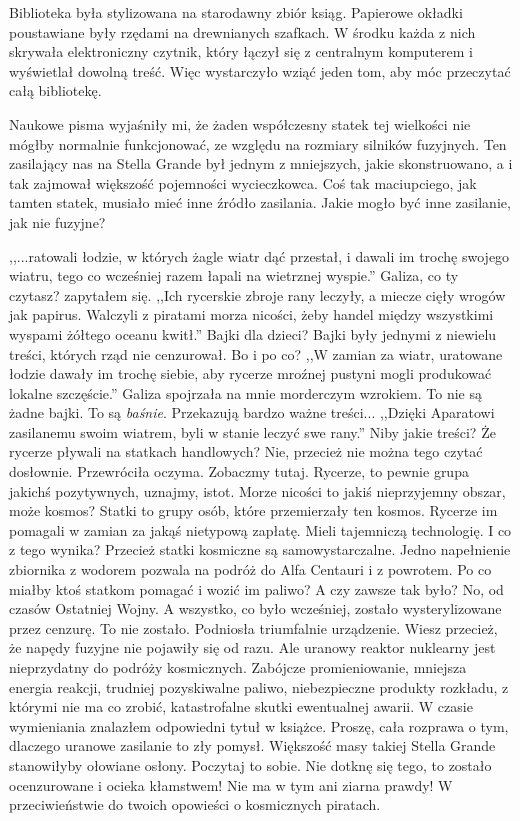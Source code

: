 Biblioteka była stylizowana na starodawny zbiór ksiąg.
Papierowe okładki poustawiane były rzędami na drewnianych szafkach.
W środku każda z nich skrywała elektroniczny czytnik, który łączył się z centralnym komputerem i wyświetlał dowolną treść.
Więc wystarczyło wziąć jeden tom, aby móc przeczytać całą bibliotekę.

Naukowe pisma wyjaśniły mi, że żaden współczesny statek tej wielkości nie mógłby normalnie funkcjonować, ze względu na rozmiary silników fuzyjnych.
Ten zasilający nas na Stella Grande był jednym z mniejszych, jakie skonstruowano, a i tak zajmował większość pojemności wycieczkowca.
Coś tak maciupciego, jak tamten statek, musiało mieć inne źródło zasilania.
Jakie mogło być inne zasilanie, jak nie fuzyjne?

\begin{dialogue}
	\ds{} ,,...ratowali łodzie, w których żagle wiatr dąć przestał, i dawali im trochę swojego wiatru, tego co wcześniej razem łapali na wietrznej wyspie.''
	\ds{} Galiza, co ty czytasz? \dm{} zapytałem się.
	\ds{} ,,Ich rycerskie zbroje rany leczyły, a miecze cięły wrogów jak papirus. Walczyli z piratami morza nicości, żeby handel między wszystkimi wyspami żółtego oceanu kwitł.''
	\ds{} Bajki dla dzieci? \dm{} Bajki były jednymi z niewielu treści, których rząd nie cenzurował. Bo i po co?
	\ds{} ,,W zamian za wiatr, uratowane łodzie dawały im trochę siebie, aby rycerze mroźnej pustyni mogli produkować lokalne szczęście.'' \dm{} Galiza spojrzała na mnie morderczym wzrokiem. \dm{} To nie są żadne bajki. To są \emph{baśnie}. Przekazują bardzo ważne treści... ,,Dzięki Aparatowi zasilanemu swoim wiatrem, byli w stanie leczyć swe rany.''
	\ds{} Niby jakie treści? Że rycerze pływali na statkach handlowych?
	\ds{} Nie, przecież nie można tego czytać dosłownie. \dm{} Przewróciła oczyma. \dm{} Zobaczmy tutaj. Rycerze, to pewnie grupa jakichś pozytywnych, uznajmy, istot. Morze nicości to jakiś nieprzyjemny obszar, może kosmos? Statki to grupy osób, które przemierzały ten kosmos. Rycerze im pomagali w zamian za jakąś nietypową zapłatę. Mieli tajemniczą technologię.
	\ds{} I co z tego wynika? Przecież statki kosmiczne są samowystarczalne. Jedno napełnienie zbiornika z wodorem pozwala na podróż do Alfa Centauri i z powrotem. Po co miałby ktoś statkom pomagać i wozić im paliwo?
	\ds{} A czy zawsze tak było?
	\ds{} No, od czasów Ostatniej Wojny. A wszystko, co było wcześniej, zostało wysterylizowane przez cenzurę.
	\ds{} To nie zostało. \dm{} Podniosła triumfalnie urządzenie. \dm{} Wiesz przecież, że napędy fuzyjne nie pojawiły się od razu.
	\ds{} Ale uranowy reaktor nuklearny jest nieprzydatny do podróży kosmicznych. Zabójcze promieniowanie, mniejsza energia reakcji, trudniej pozyskiwalne paliwo, niebezpieczne produkty rozkładu, z którymi nie ma co zrobić, katastrofalne skutki ewentualnej awarii. \dm{} W czasie wymieniania znalazłem odpowiedni tytuł w książce. \dm{} Proszę, cała rozprawa o tym, dlaczego uranowe zasilanie to zły pomysł. Większość masy takiej Stella Grande stanowiłyby ołowiane osłony. Poczytaj to sobie.
	\ds{} Nie dotknę się tego, to zostało ocenzurowane i ocieka kłamstwem! Nie ma w tym ani ziarna prawdy!
	\ds{} W przeciwieństwie do twoich opowieści o kosmicznych piratach.
\end{dialogue}

